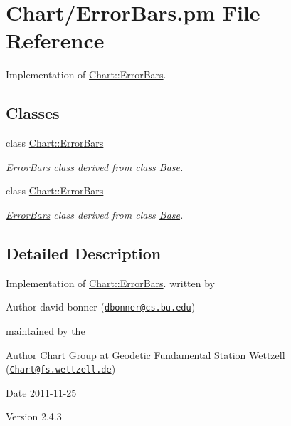 \hypertarget{ErrorBars_8pm}{
\section{Chart/ErrorBars.pm File Reference}
\label{ErrorBars_8pm}
}


Implementation of \hyperlink{classChart_1_1ErrorBars}{Chart::ErrorBars}.  


\subsection*{Classes}
\begin{DoxyCompactItemize}
\item 
class \hyperlink{classChart_1_1ErrorBars}{Chart::ErrorBars}
\begin{DoxyCompactList}\small\item\em \hyperlink{classChart_1_1ErrorBars}{ErrorBars} class derived from class \hyperlink{classChart_1_1Base}{Base}. \item\end{DoxyCompactList}\item 
class \hyperlink{classChart_1_1ErrorBars}{Chart::ErrorBars}
\begin{DoxyCompactList}\small\item\em \hyperlink{classChart_1_1ErrorBars}{ErrorBars} class derived from class \hyperlink{classChart_1_1Base}{Base}. \item\end{DoxyCompactList}\end{DoxyCompactItemize}


\subsection{Detailed Description}
Implementation of \hyperlink{classChart_1_1ErrorBars}{Chart::ErrorBars}. written by \begin{DoxyAuthor}{Author}
david bonner (\href{mailto:dbonner@cs.bu.edu}{\tt dbonner@cs.bu.edu})
\end{DoxyAuthor}
maintained by the \begin{DoxyAuthor}{Author}
Chart Group at Geodetic Fundamental Station Wettzell (\href{mailto:Chart@fs.wettzell.de}{\tt Chart@fs.wettzell.de}) 
\end{DoxyAuthor}
\begin{DoxyDate}{Date}
2011-\/11-\/25 
\end{DoxyDate}
\begin{DoxyVersion}{Version}
2.4.3 
\end{DoxyVersion}
